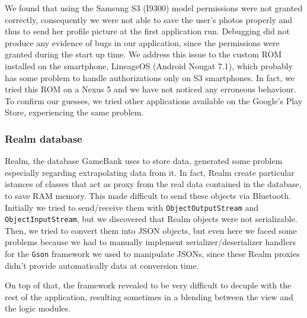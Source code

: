 We found that using the Samsung S3 (I9300) model permissions were not granted 
correctly, consequently we were not able to save the user's photos properly and 
thus to send her profile picture at the first application run. Debugging did 
not produce any evidence of bugs in our application, since the permissions 
were granted during the start up time.
We address this issue to the custom ROM installed on the smartphone, LineageOS 
(Android Nougat 7.1), which probably has some problem to handle authorizations 
only on S3 smartphones. In fact, we tried this ROM on a Nexus 5 and we have not 
noticed any erroneous behaviour. To confirm our guesses, we tried other 
applications available on the Google's Play Store, experiencing the same 
problem.

\subsubsection{Realm database}

Realm, the database GameBank uses to store data, generated some problem 
especially regarding extrapolating data from it. In fact, Realm create 
particular istances of classes that act as proxy from the real data contained 
in the database, to save RAM memory. This made difficult to send these objects 
via Bluetooth. Initially we tried to send/receive them with 
\texttt{ObjectOutputStream} and \texttt{ObjectInputStream}, but we discovered 
that Realm objects were not serializable. Then, we tried to convert them into 
JSON objects, but even here we faced some problems because we had to manually 
implement serializer/deserializer handlers for the \texttt{Gson} framework we 
used to manipulate JSONs, since these Realm proxies didn't provide 
automatically data at conversion time.

On top of that, the framework revealed to be very difficult to decuple with the 
rest of the application, resulting sometimes in a blending between the view and 
the logic modules.